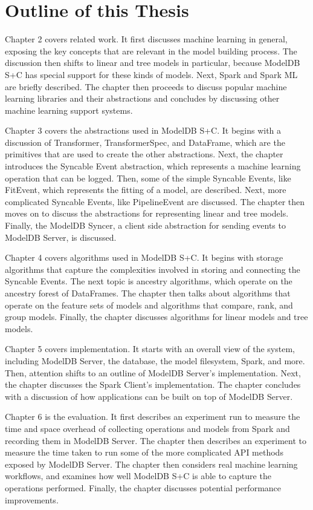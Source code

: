 \section{Outline of this Thesis}

Chapter 2 covers related work. It first discusses machine learning in general,
exposing the key concepts that are relevant in the model building process. The
discussion then shifts to linear and tree models in particular, because ModelDB S+C has 
special support for these kinds of models. 
Next, Spark and Spark ML are briefly described. The chapter then proceeds to discuss popular
machine learning libraries and their abstractions and concludes by discussing other machine
learning support systems.

Chapter 3 covers the abstractions used in ModelDB S+C.
It begins with a discussion of Transformer, TransformerSpec, and DataFrame, which are
the primitives that are used to create the other abstractions. Next, the chapter
introduces the Syncable Event abstraction, which represents a machine learning
operation that can be logged. Then, some of the simple Syncable Events, like FitEvent,
which represents the fitting of a model, are described. Next, more complicated Syncable
Events, like PipelineEvent are discussed. The chapter then moves on to discuss the
abstractions for representing linear and tree models. Finally, the ModelDB Syncer,
a client side abstraction for sending events to ModelDB Server, is discussed.

Chapter 4 covers algorithms used in ModelDB S+C. It 
begins with storage algorithms that capture the complexities involved in storing
and connecting the Syncable Events. The next topic is ancestry algorithms, which
operate on the ancestry forest of DataFrames. The chapter then talks about algorithms
that operate on the feature sets of models and algorithms that compare, rank,
and group models. Finally, the chapter discusses algorithms for linear models
and tree models.

Chapter 5 covers implementation. It starts with an overall view of the system,
including ModelDB Server, the database, the model filesystem, Spark, and more. 
Then, attention shifts to an outline of ModelDB Server's implementation. Next,
the chapter discusses the Spark Client's implementation. The chapter concludes with
a discussion of how applications can be built on top of ModelDB Server.

Chapter 6 is the evaluation. It first describes an experiment run to measure the
time and space overhead of collecting operations and models from Spark and recording
them in ModelDB Server. The chapter then describes an experiment to measure
the time taken to run some of the more complicated API methods exposed by ModelDB Server.
The chapter then considers real machine learning workflows, and examines how well ModelDB S+C is
able to capture the operations performed.
Finally, the chapter discusses potential performance
improvements.

